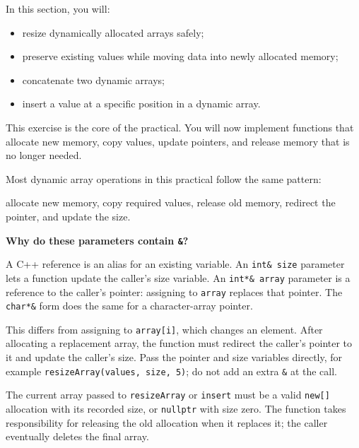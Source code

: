 \documentclass{csc2059practical}
\begin{document}
\begin{learningoutcomes}
In this section, you will:
\begin{itemize}
  \item resize dynamically allocated arrays safely;
  \item preserve existing values while moving data into newly allocated memory;
  \item concatenate two dynamic arrays;
  \item insert a value at a specific position in a dynamic array.
\end{itemize}
\end{learningoutcomes}

This exercise is the core of the practical. You will now implement functions that allocate new memory, copy values, update pointers, and release memory that is no longer needed.

\begin{importantnote}
Most dynamic array operations in this practical follow the same pattern:

allocate new memory, copy required values, release old memory, redirect the pointer, and update the size.
\end{importantnote}

\begin{infobox}
\textbf{Why do these parameters contain \texttt{\&}?}

A C++ reference is an alias for an existing variable. An \texttt{int\& size} parameter lets a function update the caller's size variable. An \texttt{int*\& array} parameter is a reference to the caller's pointer: assigning to \texttt{array} replaces that pointer. The \texttt{char*\&} form does the same for a character-array pointer.

This differs from assigning to \texttt{array[i]}, which changes an element. After allocating a replacement array, the function must redirect the caller's pointer to it and update the caller's size. Pass the pointer and size variables directly, for example \texttt{resizeArray(values, size, 5)}; do not add an extra \texttt{\&} at the call.
\end{infobox}

The current array passed to \texttt{resizeArray} or \texttt{insert} must be a valid \texttt{new[]} allocation with its recorded size, or \texttt{nullptr} with size zero. The function takes responsibility for releasing the old allocation when it replaces it; the caller eventually deletes the final array.
\end{document}
